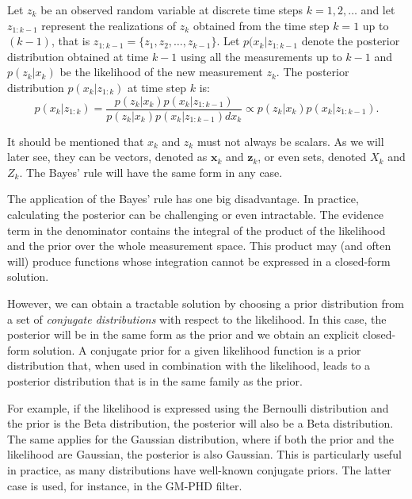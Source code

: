 \begin{theorem}
    Let $z_k$ be an observed random variable at discrete time steps
    $k = 1, 2, \ldots$ and let $z_{1:k-1}$ represent the realizations of $z_k$ 
    obtained from the time step $k = 1$ up to $(k-1)$, that is $z_{1:k-1} = 
    \{z_1, z_2,\ldots, z_{k-1}\}$. Let $p(x_k | z_{1:k-1}$ denote the posterior 
    distribution obtained at time $k-1$ using all the measurements up to $k-1$ 
    and $p(z_k | x_k)$ be the likelihood of the new measurement $z_k$. The 
    posterior distribution $p(x_k | z_{1:k})$ at time step $k$ is:
    $$
    p(x_k | z_{1:k}) 
        = \frac
            { p(z_k | x_k) p(x_k | z_{1:k-1}) }
            { p(z_k | x_k) p(x_k | z_{1:k-1}) dx_k }
        \propto p(z_k | x_k) p(x_k | z_{1:k-1}).
    $$
\end{theorem}

It should be mentioned that $x_k$ and $z_k$ must not always be scalars. As we
will later see, they can be vectors, denoted as $\mathbf{x}_k$ and 
$\mathbf{z}_k$, or even sets, denoted $X_k$ and $Z_k$. The Bayes' rule will
have the same form in any case.

The application of the Bayes' rule has one big disadvantage. In practice, 
calculating the posterior can be challenging or even intractable. The evidence 
term in the denominator contains the integral of the product of the likelihood 
and the prior over the whole measurement space. This product may (and often 
will) produce functions whose integration cannot be expressed in a closed-form 
solution.

However, we can obtain a tractable solution by choosing a prior distribution 
from a set of \textit{conjugate distributions} with respect to the likelihood. 
In this case, the posterior will be in the same form as the prior and we obtain 
an explicit closed-form solution. A conjugate prior for a given likelihood 
function is a prior distribution that, when used in combination with the 
likelihood, leads to a posterior distribution that is in the same family as the 
prior.

For example, if the likelihood is expressed using the Bernoulli distribution 
and the prior is the Beta distribution, the posterior will also be a Beta 
distribution. The same applies for the Gaussian distribution, where if both the 
prior and the likelihood are Gaussian, the posterior is also Gaussian. This is 
particularly useful in practice, as many distributions have well-known 
conjugate priors. The latter case is used, for instance, in the GM-PHD filter.

